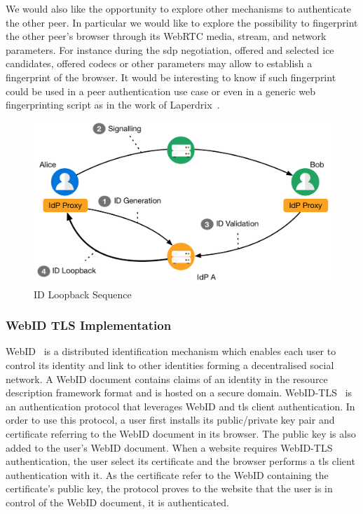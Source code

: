 We would also like the opportunity to explore other mechanisms to authenticate the other peer.
In particular we would like to explore the possibility to fingerprint the other peer's browser through its WebRTC media, stream, and network parameters.
For instance during the \gls{sdp} negotiation, offered and selected \gls{ice} candidates, offered codecs or other parameters may allow to establish a fingerprint of the browser.
It would be interesting to know if such fingerprint could be used in a peer authentication use case or even in a generic web fingerprinting script as in the work of Laperdrix~\etal\cite{laperdrix2016}. 

\begin{figure}[htb]
\centering
\includegraphics[scale=.5]{images/loopback}
\caption{ID Loopback Sequence}
\label{fig:loopback}
\end{figure}

\subsubsection{WebID TLS Implementation}
WebID~\cite{sporny2011webid} is a distributed identification mechanism which enables each user to control its identity and link to other identities forming a decentralised social network.
A WebID document contains claims of an identity in the resource description framework format and is hosted on a secure domain. 
WebID-TLS~\cite{story2013webid} is an authentication protocol that leverages WebID and \gls{tls} client authentication.
In order to use this protocol, a user first installs its public/private key pair and certificate referring to the WebID document in its browser.
The public key is also added to the user's WebID document.
When a website requires WebID-TLS authentication, the user select its certificate and the browser performs a \gls{tls} client authentication with it.
As the certificate refer to the WebID containing the certificate's public key, the protocol proves to the website that the user is in control of the WebID document, \ie it is authenticated.

